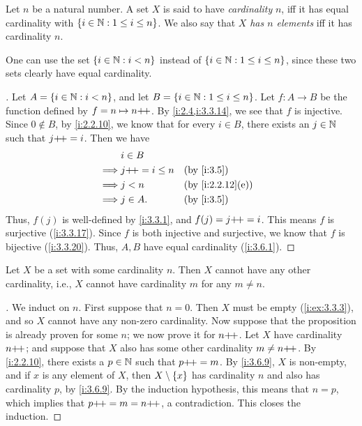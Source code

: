 \begin{defn}\label{i:3.6.5}
  Let \(n\) be a natural number.
  A set \(X\) is said to have \emph{cardinality} \(n\), iff it has equal cardinality with \(\left\lbrace i \in \mathbb{N} : 1 \leq i \leq n\right\rbrace\).
  We also say that \(X\) \emph{has \(n\) elements} iff it has cardinality \(n\).
\end{defn}

\begin{rmk}\label{i:3.6.6}
  One can use the set \(\left\lbrace i \in \mathbb{N} : i < n\right\rbrace\) instead of \(\left\lbrace i \in \mathbb{N} : 1 \leq i \leq n\right\rbrace\), since these two sets clearly have equal cardinality.
\end{rmk}

\begin{proof}[]
  Let \(A = \left\lbrace i \in \mathbb{N} : i < n\right\rbrace\), and let \(B = \left\lbrace i \in \mathbb{N} : 1 \leq i \leq n\right\rbrace\).
  Let \(f : A \to B\) be the function defined by \(f = n \mapsto n{+}\!{+}\).
  By \cref{i:2.4,i:3.3.14}, we see that \(f\) is injective.
  Since \(0 \notin B\), by \cref{i:2.2.10}, we know that for every \(i \in B\), there exists an \(j \in \mathbb{N}\) such that \(j{+}\!{+} = i\).
  Then we have
  \begin{align*}
             & i \in B                               \\
    \implies & j\pp = i \leq n &  & \by{i:3.5}       \\
    \implies & j < n           &  & \by{i:2.2.12}[e] \\
    \implies & j \in A.        &  & \by{i:3.5}
  \end{align*}
  Thus, \(f(j)\) is well-defined by \cref{i:3.3.1}, and \(f(j) = j{+}\!{+} = i\).
  This means \(f\) is surjective (\cref{i:3.3.17}).
  Since \(f\) is both injective and surjective, we know that \(f\) is bijective (\cref{i:3.3.20}).
  Thus, \(A, B\) have equal cardinality (\cref{i:3.6.1}).
\end{proof}

\setcounter{thm}{7}
\begin{prop}\label{i:3.6.8}
  Let \(X\) be a set with some cardinality \(n\).
  Then \(X\) cannot have any other cardinality, i.e., \(X\) cannot have cardinality \(m\) for any \(m \neq n\).
\end{prop}

\begin{proof}[]
  We induct on \(n\).
  First suppose that \(n = 0\).
  Then \(X\) must be empty (\cref{i:ex:3.3.3}), and so \(X\) cannot have any non-zero cardinality.
  Now suppose that the proposition is already proven for some \(n\);
  we now prove it for \(n{+}\!{+}\).
  Let \(X\) have cardinality \(n{+}\!{+}\);
  and suppose that \(X\) also has some other cardinality \(m \neq n{+}\!{+}\).
  By \cref{i:2.2.10}, there exists a \(p \in \mathbb{N}\) such that \(p{+}\!{+} = m\).
  By \cref{i:3.6.9}, \(X\) is non-empty, and if \(x\) is any element of \(X\), then \(X \setminus \left\lbrace x\right\rbrace\) has cardinality \(n\) and also has cardinality \(p\), by \cref{i:3.6.9}.
  By the induction hypothesis, this means that \(n = p\), which implies that \(p{+}\!{+} = m = n{+}\!{+}\), a contradiction.
  This closes the induction.
\end{proof}

